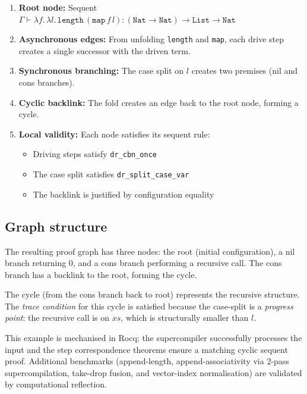 \begin{enumerate}
\item \textbf{Root node:} Sequent $\Gamma \vdash \lambda f.\, \lambda l.\, \mathtt{length}\,(\mathtt{map}\,f\,l) : (\mathtt{Nat} \to \mathtt{Nat}) \to \mathtt{List} \to \mathtt{Nat}$

\item \textbf{Asynchronous edges:} From unfolding \texttt{length} and \texttt{map}, each drive step creates a single successor with the driven term.

\item \textbf{Synchronous branching:} The case split on $l$ creates two premises (nil and cons branches).

\item \textbf{Cyclic backlink:} The fold creates an edge back to the root node, forming a cycle.

\item \textbf{Local validity:} Each node satisfies its sequent rule:
\begin{itemize}
  \item Driving steps satisfy \texttt{dr\_cbn\_once}
  \item The case split satisfies \texttt{dr\_split\_case\_var}
  \item The backlink is justified by configuration equality
\end{itemize}
\end{enumerate}

\subsection{Graph structure}

The resulting proof graph has three nodes: the root (initial configuration), a nil branch returning 0, and a cons branch performing a recursive call. The cons branch has a backlink to the root, forming the cycle.

The cycle (from the cons branch back to root) represents the recursive structure. The \emph{trace condition} for this cycle is satisfied because the case-split is a \emph{progress point}: the recursive call is on $xs$, which is structurally smaller than $l$.

This example is mechanised in Rocq; the supercompiler successfully processes the input and the step correspondence theorems ensure a matching cyclic sequent proof. Additional benchmarks (append-length, append-associativity via 2-pass supercompilation, take-drop fusion, and vector-index normalisation) are validated by computational reflection.
